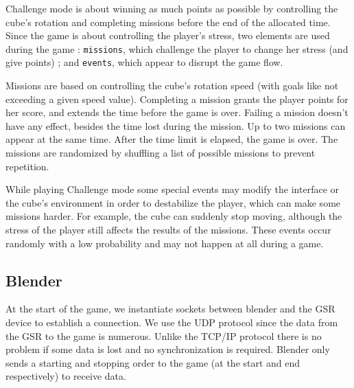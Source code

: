 \documentclass[12pt,a4paper]{article}
\begin{document}
Challenge mode is about winning as much points as possible by controlling the cube's rotation and completing missions before the end of the allocated time. Since the game is about controlling the player's stress, two elements are used during the game : \texttt{missions}, which challenge the player to change her stress (and give points) ; and \texttt{events}, which appear to disrupt the game flow.

Missions are based on controlling the cube's rotation speed (with goals like not exceeding a given speed value). Completing a mission grants the player points for her score, and extends the time before the game is over. Failing a mission doesn't have any effect, besides the time lost during the mission. Up to two missions can appear at the same time. After the time limit is elapsed, the game is over. The missions are randomized  by shuffling a list of possible missions to prevent repetition.


While playing Challenge mode some special events may modify the interface or the cube's environment in order to destabilize the player, which can make some missions harder. For example, the cube can suddenly stop moving, although the stress of the player still affects the results of the missions. These events occur randomly with a low probability and may not happen at all during a game.

%


\subsection{Blender}

At the start of the game, we instantiate sockets between blender and the GSR device to establish a connection. We use the UDP protocol since the data from the GSR to the game is numerous. Unlike the TCP/IP protocol there is no problem if some data is lost and no synchronization is required. Blender only sends a starting and stopping order to the game (at the start and end respectively) to receive data.
\end{document}
